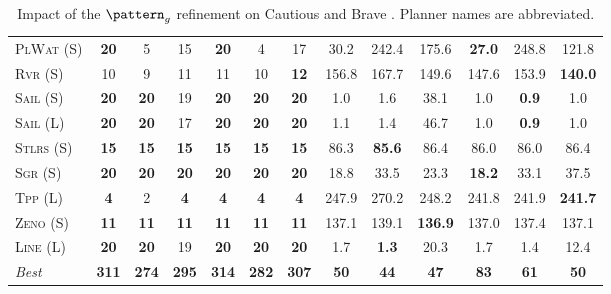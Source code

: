 \begin{table}[tb]
{\begin{tabular}{|l||cccccc||cccccc||}
\textsc{PlWat} (S)&\textbf{20}&5&15&\textbf{20}&4&17&30.2&242.4&175.6&\textbf{27.0}&248.8&121.8\\
\textsc{Rvr} (S)&10&9&11&11&10&\textbf{12}&156.8&167.7&149.6&147.6&153.9&\textbf{140.0}\\
\textsc{Sail} (S)&\textbf{20}&\textbf{20}&19&\textbf{20}&\textbf{20}&\textbf{20}&1.0&1.6&38.1&1.0&\textbf{0.9}&1.0\\
\textsc{Sail} (L)&\textbf{20}&\textbf{20}&17&\textbf{20}&\textbf{20}&\textbf{20}&1.1&1.4&46.7&1.0&\textbf{0.9}&1.0\\
\textsc{Stlrs} (S)&\textbf{15}&\textbf{15}&\textbf{15}&\textbf{15}&\textbf{15}&\textbf{15}&86.3&\textbf{85.6}&86.4&86.0&86.0&86.4\\
\textsc{Sgr} (S)&\textbf{20}&\textbf{20}&\textbf{20}&\textbf{20}&\textbf{20}&\textbf{20}&18.8&33.5&23.3&\textbf{18.2}&33.1&37.5\\
\textsc{Tpp} (L)&\textbf{4}&2&\textbf{4}&\textbf{4}&\textbf{4}&\textbf{4}&247.9&270.2&248.2&241.8&241.9&\textbf{241.7}\\
\textsc{Zeno} (S)&\textbf{11}&\textbf{11}&\textbf{11}&\textbf{11}&\textbf{11}&\textbf{11}&137.1&139.1&\textbf{136.9}&137.0&137.4&137.1\\
\textsc{Line} (L)&\textbf{20}&\textbf{20}&19&\textbf{20}&\textbf{20}&\textbf{20}&1.7&\textbf{1.3}&20.3&1.7&1.4&12.4
\\\hline
\textit{Best}&\textbf{311}&\textbf{274}&\textbf{295}&\textbf{314}&\textbf{282}&\textbf{307}&\textbf{50}&\textbf{44}&\textbf{47}&\textbf{83}&\textbf{61}&\textbf{50}\\\hline

        \end{tabular}}
        \caption{Impact of the $\pattern_g$ refinement on Cautious and Brave \pattyd. Planner names are abbreviated.}
        \label{tab:abl-patterng}
        \end{table}
        
